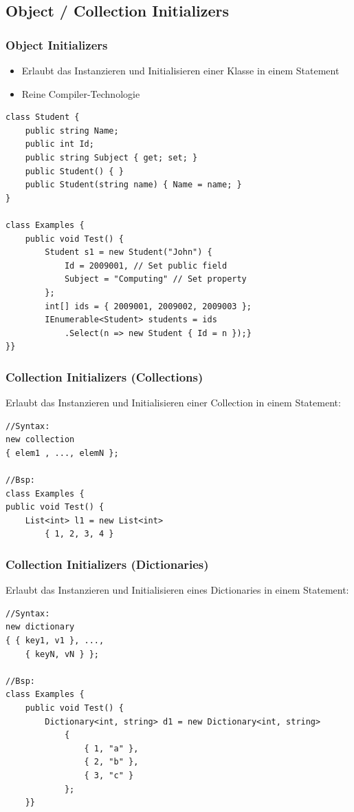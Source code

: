 \subsection{Object / Collection Initializers}

\subsubsection{Object Initializers}
\begin{itemize}
    \item Erlaubt das Instanzieren und Initialisieren einer Klasse in einem Statement
    \item  Reine Compiler-Technologie
\end{itemize}
\begin{lstlisting}
class Student {
    public string Name;
    public int Id;
    public string Subject { get; set; }
    public Student() { }
    public Student(string name) { Name = name; }
}

class Examples {
    public void Test() {
        Student s1 = new Student("John") {
            Id = 2009001, // Set public field
            Subject = "Computing" // Set property
        };
        int[] ids = { 2009001, 2009002, 2009003 };
        IEnumerable<Student> students = ids
            .Select(n => new Student { Id = n });}
}}
\end{lstlisting}

\subsubsection{Collection Initializers (Collections)}
Erlaubt das Instanzieren und Initialisieren einer Collection in einem Statement:
\begin{lstlisting}
//Syntax:
new collection
{ elem1 , ..., elemN };

//Bsp:
class Examples {
public void Test() {
    List<int> l1 = new List<int>
        { 1, 2, 3, 4 }
\end{lstlisting}

\subsubsection{Collection Initializers (Dictionaries)}
Erlaubt das Instanzieren und Initialisieren eines Dictionaries in einem Statement:
\begin{lstlisting}
//Syntax:
new dictionary
{ { key1, v1 }, ...,
    { keyN, vN } };

//Bsp:
class Examples {
    public void Test() {
        Dictionary<int, string> d1 = new Dictionary<int, string>
            {
                { 1, "a" },
                { 2, "b" },
                { 3, "c" }
            };
    }}
\end{lstlisting}

